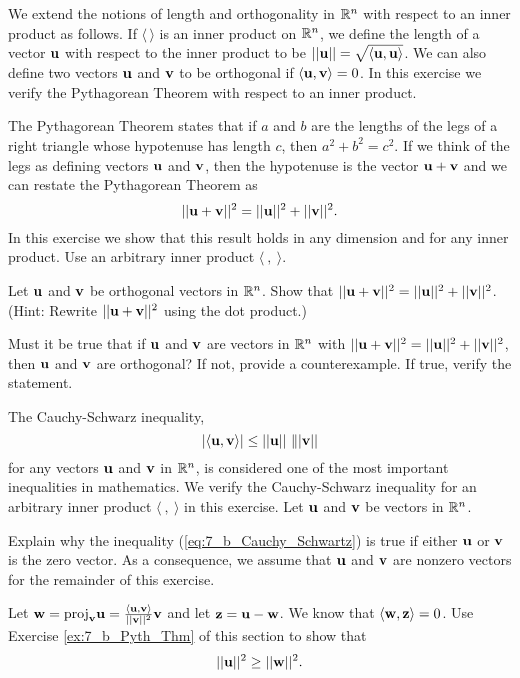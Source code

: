 \item \label{ex:7_b_Pyth_Thm} We extend the notions of length and orthogonality in $\mathbb{R}^n$ with respect to an inner product as follows. If $\langle \, \rangle$ is an inner product on $\mathbb{R}^n$, we define the length of a vector $\mathbf{u}$ with respect to the inner product to be $||\mathbf{u}|| = \sqrt{\langle \mathbf{u}, \mathbf{u} \rangle}$. We can also define two vectors $\mathbf{u}$ and $\mathbf{v}$ to be orthogonal if $\langle \mathbf{u}, \mathbf{v} \rangle = 0$. In this exercise we verify the Pythagorean Theorem with respect to an inner product.

The Pythagorean Theorem states that if $a$ and $b$ are the lengths of the legs of a right triangle whose hypotenuse has length $c$, then $a^2+b^2=c^2$. If we think of the legs as defining vectors $\mathbf{u}$ and $\mathbf{v}$, then the hypotenuse is the vector $\mathbf{u}+\mathbf{v}$ and we can restate the Pythagorean Theorem as 
\[||\mathbf{u}+\mathbf{v}||^2 = ||\mathbf{u}||^2+||\mathbf{v}||^2.\]
In this exercise we show that this result holds in any dimension and for any inner product. Use an arbitrary inner product $\langle \ , \ \rangle$. 
	\ba
	\item Let $\mathbf{u}$ and $\mathbf{v}$ be orthogonal vectors in $\mathbb{R}^n$. Show that $||\mathbf{u}+\mathbf{v}||^2 = ||\mathbf{u}||^2+||\mathbf{v}||^2$. (Hint: Rewrite $||\mathbf{u}+\mathbf{v}||^2$ using the dot product.)  
	\item Must it be true that if $\mathbf{u}$ and $\mathbf{v}$ are vectors in $\mathbb{R}^n$ with $||\mathbf{u}+\mathbf{v}||^2 = ||\mathbf{u}||^2+||\mathbf{v}||^2$, then $\mathbf{u}$ and $\mathbf{v}$ are orthogonal? If not, provide a counterexample. If true, verify the statement.
	\ea
	
\item \label{ex:7_b_Cauchy_Schwarz} The Cauchy-Schwarz inequality,
\begin{equation} \label{eq:7_b_Cauchy_Schwartz}
|\langle \mathbf{u}, \mathbf{v} \rangle| \leq ||\mathbf{u}|| \ \||\mathbf{v}||
\end{equation}
for any vectors $\mathbf{u}$ and $\mathbf{v}$ in $\mathbb{R}^n$, is considered one of the most important inequalities in mathematics. We verify the Cauchy-Schwarz inequality for an arbitrary inner product $\langle \ , \ \rangle$ in this exercise. Let $\mathbf{u}$ and $\mathbf{v}$ be vectors in $\mathbb{R}^n$. 
	\ba
	\item Explain why the inequality (\ref{eq:7_b_Cauchy_Schwartz}) is true if either $\mathbf{u}$ or $\mathbf{v}$ is the zero vector. As a consequence, we assume that $\mathbf{u}$ and $\mathbf{v}$ are nonzero vectors for the remainder of this exercise. 
	\item Let $\mathbf{w} = \text{proj}_{\mathbf{v}} \mathbf{u} = \frac{\langle \mathbf{u}, \mathbf{v} \rangle }{||\mathbf{v}||^2} \mathbf{v}$ and let $\mathbf{z} = \mathbf{u} - \mathbf{w}$. We know that $\langle \mathbf{w}, \mathbf{z} \rangle = 0$. Use Exercise \ref{ex:7_b_Pyth_Thm} of this section to show that 
	\[||\mathbf{u}||^2 \geq ||\mathbf{w}||^2.\]


